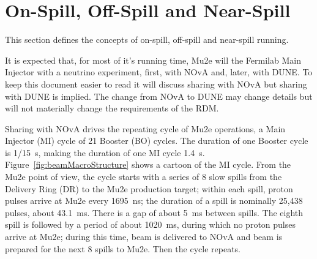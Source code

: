 \section{On-Spill, Off-Spill and Near-Spill}

This section defines the concepts of on-spill, off-spill and near-spill running.

It is expected that, for most of it's running time,
Mu2e will the Fermilab Main Injector with a neutrino experiment,
first, with NOvA and, later, with DUNE.
To keep this document easier to read it will discuss sharing with NOvA but sharing with DUNE is implied.
The change from NOvA to DUNE may change details
but will not materially change the requirements of the RDM.

Sharing with NOvA drives the repeating cycle of Mu2e operations, a Main Injector (MI) cycle of
21 Booster (BO) cycles.
The duration of one Booster cycle is 1/15~s,
making the duration of one MI cycle 1.4~s.
Figure~\ref{fig:beamMacroStructure} shows a cartoon of the MI cycle.
From the Mu2e point of view, the cycle starts with a series of 8 slow spills
from the Delivery Ring (DR) to the Mu2e production target;
within each spill, proton pulses arrive at Mu2e every 1695~ns;
the duration of a spill is nominally 25,438 pulses, about 43.1~ms.
There is a gap of about 5~ms between spills.
The eighth spill is followed by a period of about 1020~ms,
during which no proton pulses arrive at Mu2e;
during this time, beam is delivered to NOvA
and beam is prepared for the next 8 spills to Mu2e.
Then the cycle repeats.

